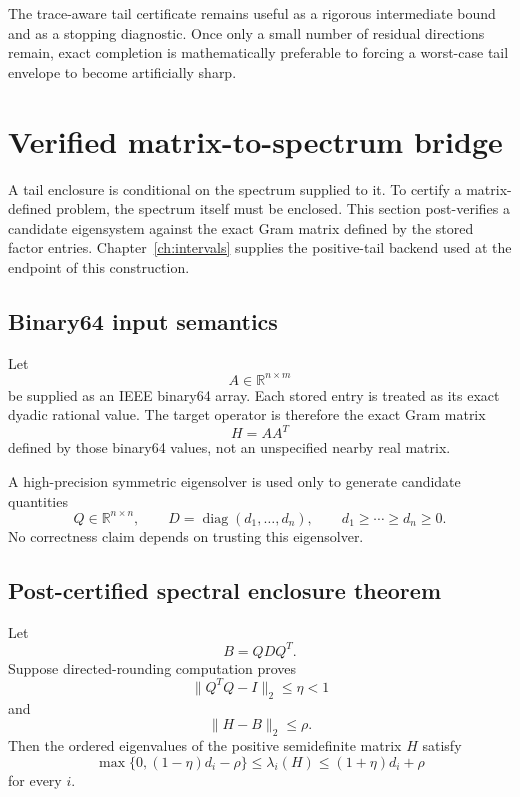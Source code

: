 The trace-aware tail certificate remains useful as a rigorous intermediate
bound and as a stopping diagnostic.  Once only a small number of residual
directions remain, exact completion is mathematically preferable to forcing a
worst-case tail envelope to become artificially sharp.


\section{Verified matrix-to-spectrum bridge}\label{sec:final-6}

A tail enclosure is conditional on the spectrum supplied to it. To certify a
matrix-defined problem, the spectrum itself must be enclosed. This section
post-verifies a candidate eigensystem against the exact Gram matrix defined
by the stored factor entries. Chapter~\ref{ch:intervals} supplies the
positive-tail backend used at the endpoint of this construction.

\subsection{Binary64 input semantics}

Let
\[
A\in\mathbb R^{n\times m}
\]
be supplied as an IEEE binary64 array.  Each stored entry is treated as its
exact dyadic rational value.  The target operator is therefore the exact Gram
matrix
\[
H=AA^T
\]
defined by those binary64 values, not an unspecified nearby real matrix.

A high-precision symmetric eigensolver is used only to generate candidate
quantities
\[
Q\in\mathbb R^{n\times n},
\qquad
D=\operatorname{diag}(d_1,\ldots,d_n),
\qquad
d_1\ge\cdots\ge d_n\ge0.
\]
No correctness claim depends on trusting this eigensolver.

\subsection{Post-certified spectral enclosure theorem}

\begin{theorem}\label{claim:final-6-1}
Let
\[
B=QDQ^T.
\]
Suppose directed-rounding computation proves
\[
\|Q^TQ-I\|_2\le\eta<1
\]
and
\[
\|H-B\|_2\le\rho.
\]
Then the ordered eigenvalues of the positive semidefinite matrix \(H\) satisfy
\[
\boxed{
\max\{0,(1-\eta)d_i-\rho\}
\le
\lambda_i(H)
\le
(1+\eta)d_i+\rho
}
\]
for every \(i\).
\end{theorem}

